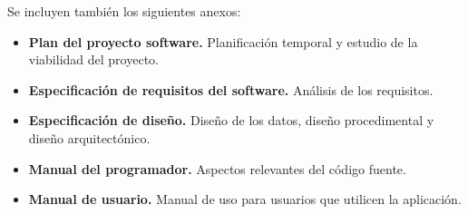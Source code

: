 Se incluyen también los siguientes anexos:

\begin{itemize}
	\tightlist
	\item
	\textbf{Plan del proyecto software.} Planificación temporal y estudio de la viabilidad del proyecto.
	\item
	\textbf{Especificación de requisitos del software.} Análisis de los requisitos.
	\item
	\textbf{Especificación de diseño.} Diseño de los datos, diseño procedimental y diseño arquitectónico.
	\item
	\textbf{Manual del programador.} Aspectos relevantes del código fuente.
	\item
	\textbf{Manual de usuario.} Manual de uso para usuarios que utilicen la aplicación.
\end{itemize}